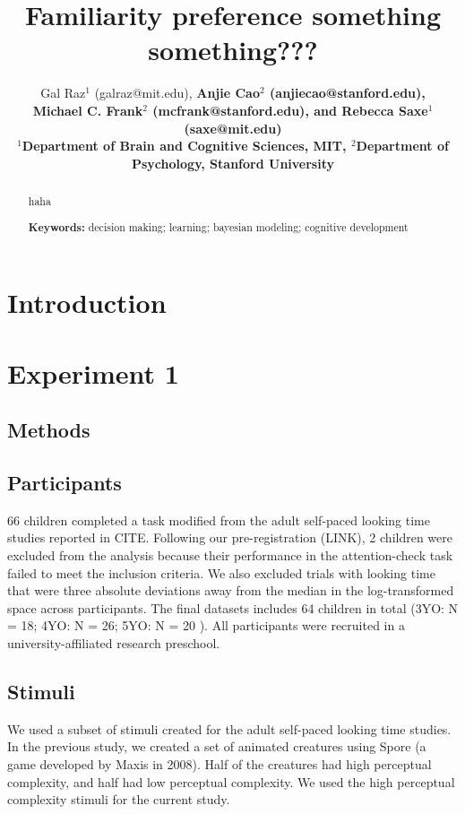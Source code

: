 \documentclass[10pt, letterpaper]{article}
\title{Familiarity preference something something???}
\author{Gal Raz$^1$ (galraz@mit.edu), \bf{Anjie Cao$^2$  (anjiecao@stanford.edu)},\\ \bf{Michael C. Frank$^2$ (mcfrank@stanford.edu)},
 and \bf{Rebecca Saxe$^1$ (saxe@mit.edu)} \\
$^1$Department of Brain and Cognitive Sciences, MIT, $^2$Department of Psychology, Stanford University \\ }
\begin{document}
\maketitle

\begin{abstract}
haha

\textbf{Keywords:}
decision making; learning; bayesian modeling; cognitive development
\end{abstract}

\hypertarget{introduction}{%
\section{Introduction}\label{introduction}}

\hypertarget{experiment-1}{%
\section{Experiment 1}\label{experiment-1}}

\hypertarget{methods}{%
\subsection{Methods}\label{methods}}

\hypertarget{participants}{%
\subsection{Participants}\label{participants}}

66 children completed a task modified from the adult self-paced looking
time studies reported in CITE. Following our pre-registration (LINK), 2
children were excluded from the analysis because their performance in
the attention-check task failed to meet the inclusion criteria. We also
excluded trials with looking time that were three absolute deviations
away from the median in the log-transformed space across participants.
The final datasets includes 64 children in total (3YO: N = 18; 4YO: N =
26; 5YO: N = 20 ). All participants were recruited in a
university-affiliated research preschool.

\hypertarget{stimuli}{%
\subsection{Stimuli}\label{stimuli}}

We used a subset of stimuli created for the adult self-paced looking
time studies. In the previous study, we created a set of animated
creatures using Spore (a game developed by Maxis in 2008). Half of the
creatures had high perceptual complexity, and half had low perceptual
complexity. We used the high perceptual complexity stimuli for the
current study.
\end{document}
